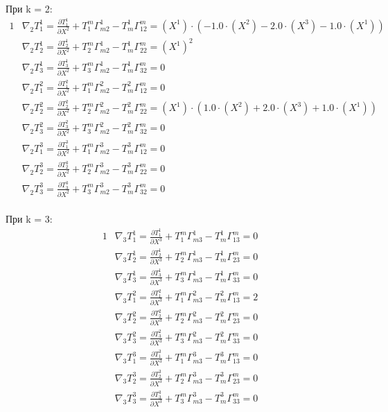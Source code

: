 \documentclass[a4paper, 12pt, oneside]{article}
\begin{document}
При k = 2:\\
\begin{alignat*}{1}
  & \nabla_2T^1_1 = \frac{\partial T^1_1}{\partial X^2} + T^m_1\Gamma^1_{m2} - T^1_m\Gamma^m_{12} = (X^1)\cdot (-1.0\cdot (X^2) - 2.0\cdot (X^3) - 1.0\cdot (X^1)) \\
  & \nabla_2T^1_2 = \frac{\partial T^1_2}{\partial X^2} + T^m_2\Gamma^1_{m2} - T^1_m\Gamma^m_{22} = (X^1)^2 \\
  & \nabla_2T^1_3 = \frac{\partial T^1_3}{\partial X^2} + T^m_3\Gamma^1_{m2} - T^1_m\Gamma^m_{32} = 0 \\
  & \nabla_2T^2_1 = \frac{\partial T^2_1}{\partial X^2} + T^m_1\Gamma^2_{m2} - T^2_m\Gamma^m_{12} = 0 \\
  & \nabla_2T^2_2 = \frac{\partial T^2_2}{\partial X^2} + T^m_2\Gamma^2_{m2} - T^2_m\Gamma^m_{22} = (X^1)\cdot (1.0\cdot (X^2) + 2.0\cdot (X^3) + 1.0\cdot (X^1)) \\
  & \nabla_2T^2_3 = \frac{\partial T^2_3}{\partial X^2} + T^m_3\Gamma^2_{m2} - T^2_m\Gamma^m_{32} = 0 \\
  & \nabla_2T^3_1 = \frac{\partial T^3_1}{\partial X^2} + T^m_1\Gamma^3_{m2} - T^3_m\Gamma^m_{12} = 0 \\
  & \nabla_2T^3_2 = \frac{\partial T^3_2}{\partial X^2} + T^m_2\Gamma^3_{m2} - T^3_m\Gamma^m_{22} = 0 \\
  & \nabla_2T^3_3 = \frac{\partial T^3_3}{\partial X^2} + T^m_3\Gamma^3_{m2} - T^3_m\Gamma^m_{32} = 0 
\end{alignat*}\\
При k = 3:\\
\begin{alignat*}{1}
  & \nabla_3T^1_1 = \frac{\partial T^1_1}{\partial X^3} + T^m_1\Gamma^1_{m3} - T^1_m\Gamma^m_{13} = 0 \\
  & \nabla_3T^1_2 = \frac{\partial T^1_2}{\partial X^3} + T^m_2\Gamma^1_{m3} - T^1_m\Gamma^m_{23} = 0 \\
  & \nabla_3T^1_3 = \frac{\partial T^1_3}{\partial X^3} + T^m_3\Gamma^1_{m3} - T^1_m\Gamma^m_{33} = 0 \\
  & \nabla_3T^2_1 = \frac{\partial T^2_1}{\partial X^3} + T^m_1\Gamma^2_{m3} - T^2_m\Gamma^m_{13} = 2 \\
  & \nabla_3T^2_2 = \frac{\partial T^2_2}{\partial X^3} + T^m_2\Gamma^2_{m3} - T^2_m\Gamma^m_{23} = 0 \\
  & \nabla_3T^2_3 = \frac{\partial T^2_3}{\partial X^3} + T^m_3\Gamma^2_{m3} - T^2_m\Gamma^m_{33} = 0 \\
  & \nabla_3T^3_1 = \frac{\partial T^3_1}{\partial X^3} + T^m_1\Gamma^3_{m3} - T^3_m\Gamma^m_{13} = 0 \\
  & \nabla_3T^3_2 = \frac{\partial T^3_2}{\partial X^3} + T^m_2\Gamma^3_{m3} - T^3_m\Gamma^m_{23} = 0 \\
  & \nabla_3T^3_3 = \frac{\partial T^3_3}{\partial X^3} + T^m_3\Gamma^3_{m3} - T^3_m\Gamma^m_{33} = 0 
\end{alignat*}\\
\end{document}
